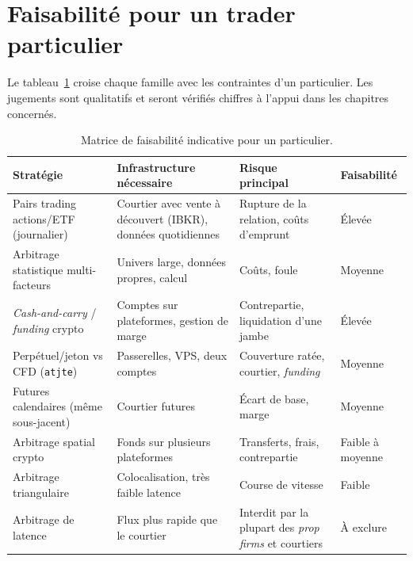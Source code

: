 \documentclass[11pt,a4paper]{article}
\begin{document}
\section{Faisabilité pour un trader particulier}

Le tableau~\ref{tab:feas} croise chaque famille avec les contraintes d'un particulier. Les jugements sont qualitatifs et seront vérifiés chiffres à l'appui dans les chapitres concernés.

\begin{table}[h]
\centering\small
\caption{Matrice de faisabilité indicative pour un particulier.}
\label{tab:feas}
\begin{tabularx}{\textwidth}{>{\raggedright}p{3.0cm}>{\raggedright}X>{\raggedright}X>{\raggedright\arraybackslash}p{1.7cm}}
\toprule
Stratégie & Infrastructure nécessaire & Risque principal & Faisabilité \\
\midrule
Pairs trading actions/ETF (journalier) & Courtier avec vente à découvert (IBKR), données quotidiennes & Rupture de la relation, coûts d'emprunt & Élevée \\
Arbitrage statistique multi-facteurs & Univers large, données propres, calcul & Coûts, foule \citep{khandanilo2011} & Moyenne \\
\emph{Cash-and-carry} / \emph{funding} crypto & Comptes sur plateformes, gestion de marge & Contrepartie, liquidation d'une jambe & Élevée \\
Perpétuel/jeton vs CFD (\texttt{atjte}) & Passerelles, VPS, deux comptes & Couverture ratée, courtier, \emph{funding} & Moyenne \\
Futures calendaires (même sous-jacent) & Courtier futures & Écart de base, marge & Moyenne \\
Arbitrage spatial crypto & Fonds sur plusieurs plateformes & Transferts, frais, contrepartie & Faible à moyenne \\
Arbitrage triangulaire & Colocalisation, très faible latence & Course de vitesse \citep{budish2015} & Faible \\
Arbitrage de latence & Flux plus rapide que le courtier & Interdit par la plupart des \emph{prop firms} et courtiers & À exclure \\
\bottomrule
\end{tabularx}
\end{table}

\end{document}
